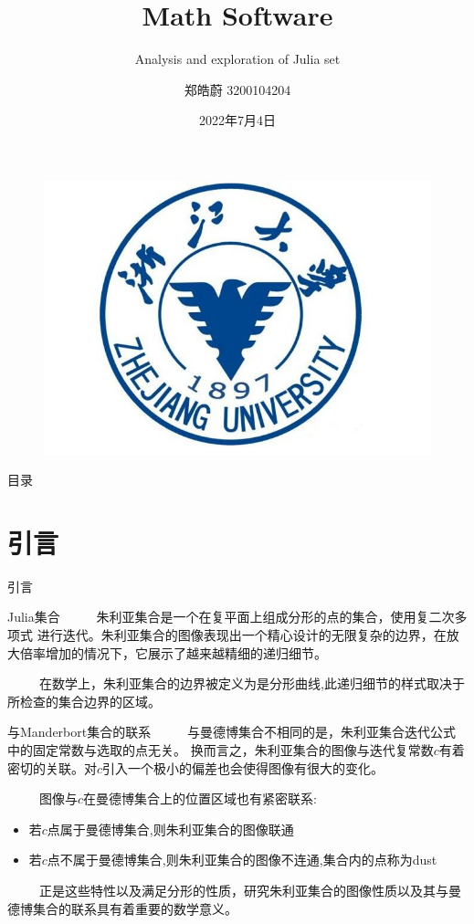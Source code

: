 \documentclass[8pt,c,compress,UTF8]{beamer}
\author{郑皓蔚 3200104204}
\title{Math Software}
\subtitle{Analysis and exploration of Julia set}
\institute{浙江大学信息与计算科学系}
\date{2022年7月4日}
\begin{document}
\kaishu
\begin{frame}
    \titlepage
    \begin{figure}[htpb]
        \begin{center}
            \includegraphics[width=0.2\linewidth]{../../pic/logo.jpeg}
        \end{center}
    \end{figure}
\end{frame}

\begin{frame}{目录}
    \tableofcontents[sectionstyle=show,subsectionstyle=show/shaded,subsubsectionstyle=show/shaded]
\end{frame}

\section{引言}
\begin{frame}{引言}
\begin{exampleblock}{Julia集合}
\ \ \ \ \ 朱利亚集合\cite{enwiki:1068868935}是一个在复平面上组成分形的点的集合，使用复二次多项式
进行迭代。朱利亚集合的图像表现出一个精心设计的无限复杂的边界，在放大倍率增加的情况下，它展示了越来越精细的递归细节。
\par 
\ \ \ \ \ 在数学上，朱利亚集合的边界被定义为是分形曲线,此递归细节的样式取决于所检查的集合边界的区域。        
\end{exampleblock}
\begin{exampleblock}{与Manderbort集合的联系}
\ \ \ \ \ 与曼德博集合\cite{enwiki:1094796296}不相同的是，朱利亚集合迭代公式中的固定常数与选取的点无关。
换而言之，朱利亚集合的图像与迭代复常数$c$有着密切的关联。对$c$引入一个极小的偏差也会使得图像有很大的变化。
\par
\ \ \ \ \ 图像与$c$在曼德博集合上的位置区域也有紧密联系\cite{s1992fractal}:
\begin{itemize}
    \setlength{\itemsep}{1pt}
    \item 若$c$点属于曼德博集合,则朱利亚集合的图像联通
    \item 若$c$点不属于曼德博集合,则朱利亚集合的图像不连通,集合内的点称为dust
\end{itemize}
\par
\ \ \ \ \ 正是这些特性以及满足分形的性质，研究朱利亚集合的图像性质以及其与曼德博集合的联系具有着重要的数学意义。        
\end{exampleblock}



\end{frame}
\end{document}
